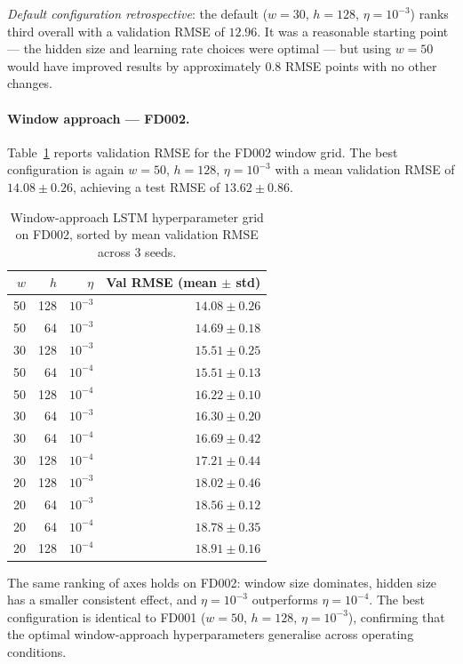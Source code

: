 \documentclass[a4paper,11pt]{article}
\begin{document}
\textit{Default configuration retrospective}: the default ($w=30$, $h=128$, $\eta=10^{-3}$) ranks third overall with a validation RMSE of $12.96$.
It was a reasonable starting point — the hidden size and learning rate choices were optimal — but using $w=50$ would have improved results by approximately 0.8 RMSE points with no other changes.

\paragraph{Window approach — FD002.}
Table~\ref{tab:hparam_window_fd002} reports validation RMSE for the FD002 window grid.
The best configuration is again $w=50$, $h=128$, $\eta=10^{-3}$ with a mean validation RMSE of $14.08 \pm 0.26$, achieving a test RMSE of $13.62 \pm 0.86$.

\begin{table}[h]
    \centering
    \begin{tabular}{rrrr}
        \hline
        $w$ & $h$ & $\eta$ & Val RMSE (mean $\pm$ std) \\
        \hline
        50 & 128 & $10^{-3}$ & $14.08 \pm 0.26$ \\
        50 & 64  & $10^{-3}$ & $14.69 \pm 0.18$ \\
        30 & 128 & $10^{-3}$ & $15.51 \pm 0.25$ \\
        50 & 64  & $10^{-4}$ & $15.51 \pm 0.13$ \\
        50 & 128 & $10^{-4}$ & $16.22 \pm 0.10$ \\
        30 & 64  & $10^{-3}$ & $16.30 \pm 0.20$ \\
        30 & 64  & $10^{-4}$ & $16.69 \pm 0.42$ \\
        30 & 128 & $10^{-4}$ & $17.21 \pm 0.44$ \\
        20 & 128 & $10^{-3}$ & $18.02 \pm 0.46$ \\
        20 & 64  & $10^{-3}$ & $18.56 \pm 0.12$ \\
        20 & 64  & $10^{-4}$ & $18.78 \pm 0.35$ \\
        20 & 128 & $10^{-4}$ & $18.91 \pm 0.16$ \\
        \hline
    \end{tabular}
    \caption{Window-approach LSTM hyperparameter grid on FD002, sorted by mean validation RMSE across 3 seeds.}
    \label{tab:hparam_window_fd002}
\end{table}

The same ranking of axes holds on FD002: window size dominates, hidden size has a smaller consistent effect, and $\eta=10^{-3}$ outperforms $\eta=10^{-4}$.
The best configuration is identical to FD001 ($w=50$, $h=128$, $\eta=10^{-3}$), confirming that the optimal window-approach hyperparameters generalise across operating conditions.
\end{document}
